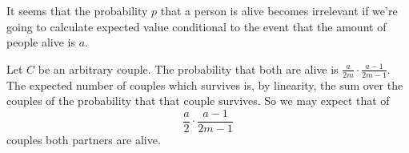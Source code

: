 \documentclass{article}
\begin{document}
\begin{ex}
It seems that the probability $p$ that a person is alive becomes irrelevant if we're going to calculate expected value conditional to the event that the amount of people alive is $a$. 

Let $C$ be an arbitrary couple. The probability that both are alive is $\frac{a}{2m}\cdot\frac{a-1}{2m-1}$. The expected number of couples which survives is, by linearity, the sum over the couples of the probability that that couple survives. So we may expect that of 
\begin{equation*}
\frac{a}{2}\cdot\frac{a-1}{2m-1}
\end{equation*}
couples both partners are alive.
\begin{comment}
My first idea was to set up a recursive 2-ary function
\begin{equation*}
A:(m,a:\mathbb{N})\to(a\leq 2m)\to\mathbb{Q},
\end{equation*}
calculating the expected number of couples in which both people are alive. We intend that $A(m,a)$ is the expected number of couples in which both partners are alive, in the event that there were originally $m$ couples and that the amount of people alive is $a$. Now we define $A$ by
\begin{align*}
A(m,0) & := 0\\
A(m,1) & := 0\\
A(m,2m-1) & := m-1\\
A(m,2m) & := m
\intertext{and for $2\leq a \leq 2m-2$ we define}
A(m,a) & := \frac{a}{2m}\cdot\frac{a-1}{2m-1}\cdot (A(m-1,a-2)+1)
  \\
& \qquad +\frac{a}{m}\cdot \frac{2m-a}{2m-1}\cdot A(m-1,a-1)
  \\
& \qquad + \frac{2m-a}{2m}\cdot\frac{2m-a-1}{2m-1}\cdot A(m-1,a)
\end{align*}
This function terminates when $0\leq a\leq 2m$. The recursion is obtained as follows: With the probability that both partners are alive we expect the value of $A(m-1,a-2)+1$; with the probability that exactly one of the partners is dead, we expect the value $A(m-1,a-1)$ and with the probability that both partners are dead we expect the value $A(m-1,a)$. It is easy to see that the function
\begin{equation*}
(m,a)\mapsto m\cdot\frac{a}{2m}\cdot\frac{a-1}{2m-1}
\end{equation*}
satisfies the first four defining equations of $A$. A little calculation is now required:
\begin{align*}

\end{comment}
\end{ex}
\end{document}
